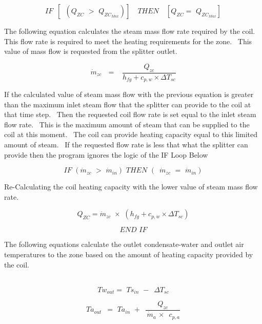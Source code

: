 \begin{equation}
IF\,\,\,\left[ {\,\,\,({Q_{ZC}}\,\, > \,\,{Q_{Z{C_{Max}}}})} \right]\,\,\,\,\,\,THEN\,\,\,\,\,\,\left[ {{Q_{ZC}} = \,\,{Q_{Z{C_{Max}}}}} \right]
\end{equation}

The following equation calculates the steam mass flow rate required by the coil.~ This flow rate is required to meet the heating requirements for the zone.~ This value of mass flow is requested from the splitter outlet.

\begin{equation}
{\dot m_{zc}}\,\,\,\, = \,\,\,\,\,\frac{{{Q_{zc}}}}{{{h_{fg}} + {c_{p,w}} \times \Delta {T_{sc}}}}
\end{equation}

If the calculated value of steam mass flow with the previous equation is greater than the maximum inlet steam flow that the splitter can provide to the coil at that time step.~ Then the requested coil flow rate is set equal to the inlet steam flow rate.~ This is the maximum amount of steam that can be supplied to the coil at this moment.~ The coil can provide heating capacity equal to this limited amount of steam.~ If the requested flow rate is less that what the splitter can provide then the program ignores the logic of the IF Loop Below

\begin{equation}
IF\,\,({\dot m_{zc}}\,\, > \,\,{\dot m_{in}})\,\,THEN\,\,(\,\,\,{\dot m_{zc}}\,\, = \,\,{\dot m_{in}})
\end{equation}

Re-Calculating the coil heating capacity with the lower value of steam mass flow rate.

\begin{equation}
{Q_{ZC}} = {\dot m_{zc}}\,\, \times \,\,({h_{fg}} + {c_{p,w}} \times \Delta {T_{sc}})
\end{equation}

\begin{equation}
END\,\,IF
\end{equation}

The following equations calculate the outlet condensate-water and outlet air temperatures to the zone based on the amount of heating capacity provided by the coil.

~~~~~ \[T{w_{out}} = \,\,T{s_{in}}\,\, - \,\,\,\Delta {T_{sc}}\]

\begin{equation}
T{a_{out}}\,\,\, = \,\,T{a_{in}}\,\, + \,\,\,\frac{{{Q_{zc}}}}{{\,{{\dot m}_a}\, \times \,\,\,{c_{p,a}}}}
\end{equation}

